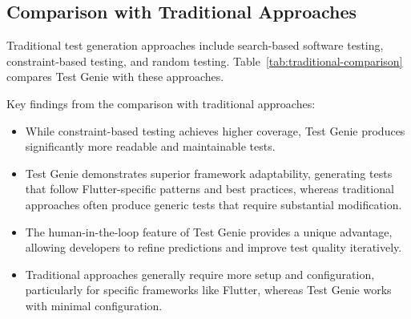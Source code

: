 \subsection{Comparison with Traditional Approaches}

Traditional test generation approaches include search-based software testing, constraint-based testing, and random testing. Table~\ref{tab:traditional-comparison} compares Test Genie with these approaches.

\begin{table}[ht]
    \centering
    \caption{Comparison with Traditional Test Generation Approaches}
    \label{tab:traditional-comparison}
\end{table}

Key findings from the comparison with traditional approaches:

\begin{itemize}
    \item While constraint-based testing achieves higher coverage, Test Genie produces significantly more readable and maintainable tests.
    
    \item Test Genie demonstrates superior framework adaptability, generating tests that follow Flutter-specific patterns and best practices, whereas traditional approaches often produce generic tests that require substantial modification.
    
    \item The human-in-the-loop feature of Test Genie provides a unique advantage, allowing developers to refine predictions and improve test quality iteratively.
    
    \item Traditional approaches generally require more setup and configuration, particularly for specific frameworks like Flutter, whereas Test Genie works with minimal configuration.
\end{itemize}

